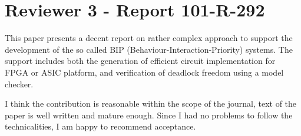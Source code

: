 \section{Reviewer 3 - Report 101-R-292}
%
%
This paper presents a decent report on rather complex approach to support the
development of the so called BIP (Behaviour-Interaction-Priority) systems. The
support includes both the generation of efficient circuit implementation for
FPGA or ASIC platform, and verification of deadlock freedom using a model checker.

I think the contribution is reasonable within the scope of the journal, text of
the paper is well written and mature enough. Since I had no problems to follow
the technicalities, I am happy to recommend acceptance.

